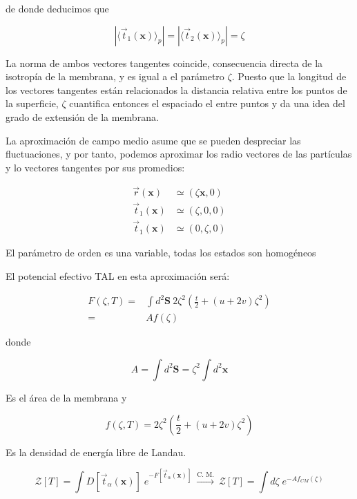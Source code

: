 de donde deducimos que

\begin{equation*}
|\langle\vec{t}_1(\mathbf{x})\rangle_{p}|=|\langle\vec{t}_2(\mathbf{x})\rangle_{p}|=\zeta
\end{equation*}

La norma de ambos vectores tangentes coincide, consecuencia directa de la
isotropía de la membrana, y es igual a el parámetro $\zeta$. Puesto que la
longitud de los vectores tangentes están relacionados la distancia relativa
entre los puntos de la superficie, $\zeta$ cuantifica entonces el espaciado el
 entre puntos y da una idea del grado de extensión de la membrana.
 
La aproximación de campo medio asume que se pueden despreciar las
fluctuaciones, y por tanto, podemos aproximar los radio vectores de las
partículas y lo vectores tangentes por sus promedios:

\begin{align}
 \vec{r}(\mathbf{x})&\simeq(\zeta \mathbf{x},0)\\
 \vec{t}_{1}(\mathbf{x})&\simeq(\zeta ,0,0)\\
 \vec{t}_{1}(\mathbf{x})&\simeq(0,\zeta,0)
\end{align}

El parámetro de orden es una variable, todas los estados son homogéneos

El potencial efectivo TAL en esta aproximación será:

\begin{align}
  F(\zeta,T)=&\int\! d^2 \mathbf{S}\ 2\zeta^2\!\left( \frac{t}{2} + (u+2v)\zeta^2\right)\\
  =&Af(\zeta)
\end{align}

donde 

$$A=\int d^2 \mathbf{S}=\zeta^2\int d^2 \mathbf{x}$$

Es el área de la membrana y 

\begin{equation*}
f(\zeta,T)=2\zeta^2\!\left( \frac{t}{2} + (u+2v)\zeta^2\right)
\end{equation*}

Es la densidad de energía libre de Landau. 

\begin{equation*}
\mathcal{Z}[T]=\int D[\vec{t}_{\alpha}(\mathbf{x})]\;
e^{-F[\vec{t}_{\alpha}(\mathbf{x})]}\
\stackrel{\text{C. M.}}{\longrightarrow}\ \mathcal{Z}[T]=\int d\zeta\;e^{-Af_{CM}(\zeta)}
\end{equation*}

